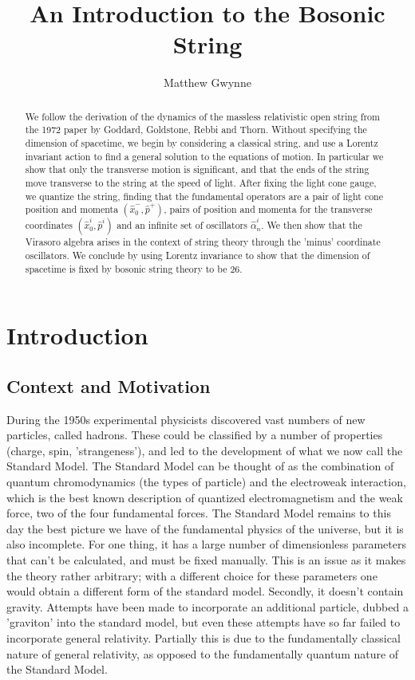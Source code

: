 \documentclass[a4paper,12pt]{article}
\numberwithin{equation}{section}
\begin{document}
\title{An Introduction to the Bosonic String}

\author{Matthew Gwynne}

\maketitle
\begin{abstract}
We follow the derivation of the dynamics of the massless relativistic open string from the 1972 paper by Goddard, Goldstone, Rebbi and Thorn. Without specifying the dimension of spacetime, we begin by considering a classical string, and use a Lorentz invariant action to find a general solution to the equations of motion. In particular we show that only the transverse motion is significant, and that the ends of the string move transverse to the string at the speed of light. After fixing the light cone gauge, we quantize the string, finding that the fundamental operators are a pair of light cone position and momenta $(\hat{x}_0^-, \hat{p}^+)$, pairs of position and momenta for the transverse coordinates $(\hat{x}_0^i, \hat{p}^i)$ and an infinite set of oscillators $\hat{\alpha}_n^i$. We then show that the Virasoro algebra arises in the context of string theory through the 'minus' coordinate oscillators. We conclude by using Lorentz invariance to show that the dimension of spacetime is fixed by bosonic string theory to be 26.

\end{abstract}
\tableofcontents

\section{Introduction}
\subsection{Context and Motivation}
During the 1950s experimental physicists discovered vast numbers of new particles, called hadrons. These could be classified by a number of properties (charge, spin, ’strangeness’), and led to the development of what we now call the Standard Model. The Standard Model can be thought of as the combination of quantum chromodynamics (the types of particle) and the electroweak interaction, which is the best known description of quantized electromagnetism and the weak force, two of the four fundamental forces. The Standard Model remains to this day the best picture we have of the fundamental physics of the universe, but it is also incomplete. For one thing, it has a large number of dimensionless parameters that can’t be calculated, and must be fixed manually. This is an issue as it makes the theory rather arbitrary; with a different choice for these parameters one would obtain a different form of the standard model. Secondly, it doesn’t contain gravity. Attempts have been made to incorporate an additional particle, dubbed a ’graviton’ into the standard model, but even these attempts have so far failed to incorporate general relativity. Partially this is due to the fundamentally classical nature of general relativity, as opposed to the fundamentally quantum nature of the Standard Model.
\end{document}

